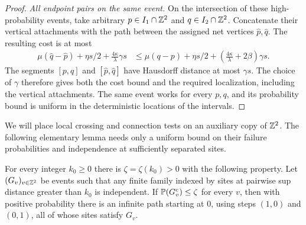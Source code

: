 \begin{proof}
\emph{All endpoint pairs on the same event.}
On the intersection of these high-probability events, take arbitrary
$p\in I_1\cap\mathbb Z^2$ and $q\in I_2\cap\mathbb Z^2$. Concatenate their vertical
attachments with the path between the assigned net vertices
$\widehat p,\widehat q$. The resulting cost is at most
\[
 \begin{split}
 \mu(\widehat q-\widehat p)+\eta s/2
       +\frac{4\kappa}{\lambda}\gamma s
 &\le \mu(q-p)+\eta s/2
       +\left(\frac{4\kappa}{\lambda}+2\beta\right)\gamma s.
 \end{split}
\]
The segments $[p,q]$ and $[\widehat p,\widehat q]$ have Hausdorff distance
at most $\gamma s$. The choice of $\gamma$ therefore gives both the cost
bound and the required localization, including the vertical attachments.
The same event works for every $p,q$, and its probability bound is uniform
in the deterministic locations of the intervals.
\end{proof}

We will place local crossing and connection tests on an auxiliary copy of
$\mathbb Z^2$. The following elementary lemma needs only a uniform bound on their
failure probabilities and independence at sufficiently separated sites.

\begin{lemma}\label{df:cr:oriented-paths}
For every integer $k_0\ge0$ there is $\zeta=\zeta(k_0)>0$ with the
following property. Let $(G_v)_{v\in\mathbb Z^2}$ be events such that any finite
family indexed by sites at pairwise sup distance greater than $k_0$ is
independent. If $\mathbb P(G_v^c)\le\zeta$ for every $v$, then with positive
probability there is an infinite path starting at $0$, using steps
$(1,0)$ and $(0,1)$, all of whose sites satisfy $G_v$.
\end{lemma}

